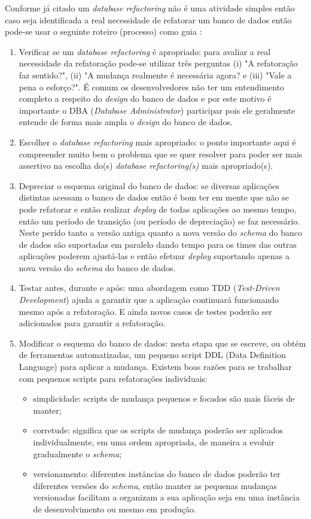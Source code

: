 \documentclass[10pt]{article}
\begin{document}
	Conforme já citado um \textit{database refactoring} não é uma atividade simples então caso seja identificada a real necessidade de refatorar um banco de dados então pode-se usar o seguinte roteiro (processo) como guia \cite{Ambler:RefactoringDatabases}:
	\begin{enumerate}
	    \item Verificar se um \textit{database refactoring} é apropriado: para avaliar a real necessidade da refatoração pode-se utilizar três perguntas (i) "A refatoração faz sentido?", (ii) "A mudança realmente é necessária agora? e (iii) "Vale a pena o esforço?". É comum os desenvolvedores não ter um entendimento completo a respeito do \textit{design} do banco de dados e por este motivo é importante o DBA (\textit{Database Administrator}) participar pois ele geralmente entende de forma mais ampla o \textit{design} do banco de dados.
		\item Escolher o \textit{database refactoring} mais apropriado: o ponto importante aqui é compreender muito bem o problema que se quer resolver para poder ser mais assertivo na escolha do(s) \textit{database refactoring(s)} mais apropriado(s).
		\item Depreciar o esquema original do banco de dados: se diversas aplicações distintas acessam o banco de dados então é bom ter em mente que não se pode refatorar e então realizar \textit{deploy} de todas aplicações ao mesmo tempo, então um período de transição (ou período de depreciação) se faz necessário. Neste perído  tanto a versão antiga quanto a nova versão do \textit{schema} do banco de dados são suportadas em paralelo dando tempo para os times das outras aplicações poderem ajustá-las e então efetuar \textit{deploy} suportando apenas a nova versão do \textit{schema} do banco de dados.
		\item Testar antes, durante e após: uma abordagem como TDD (\textit{Test-Driven Development}) ajuda a garantir que a aplicação continuará funcionando mesmo após a refatoração. E ainda novos casos de testes poderão ser adicionados para garantir a refatoração.
		
		\item Modificar o esquema do banco de dados: nesta etapa que se escreve, ou obtém de ferramentas automatizadas, um pequeno script DDL (Data Definition Language) para aplicar a mudança. Existem boas razões para se trabalhar com pequenos scripts para refatorações individuais:
		\begin{itemize}
		    \item simplicidade: scripts de mudança pequenos e focados são mais fáceis de manter;
		    \item corretude: significa que os scripts de mudança poderão ser aplicados individualmente, em uma ordem apropriada, de maneira a evoluir gradualmente o \textit{schema};
		    \item versionamento: diferentes instâncias do banco de dados poderão ter diferentes versões do \textit{schema}, então manter as pequenas mudanças versionadas facilitam a organizam a sua aplicação seja em uma instância de desenvolvimento ou mesmo em produção.
		\end{itemize}
		

\end{enumerate}
\end{document}
